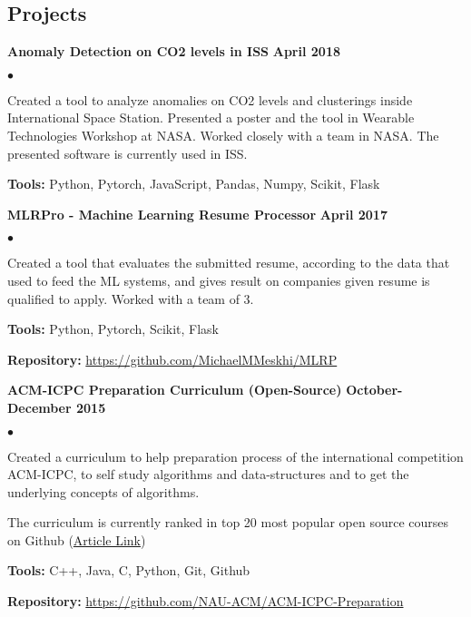 \documentclass[margin,line]{res}
\newenvironment{list2}{
  \begin{list}{$\bullet$}{%
      \setlength{\itemsep}{0in}
      \setlength{\parsep}{0in} \setlength{\parskip}{0in}
      \setlength{\topsep}{0in} \setlength{\partopsep}{0in} 
      \setlength{\leftmargin}{0.2in}}}{\end{list}}
\begin{document}
\begin{resume}
\section{\sc Projects}

{\bf Anomaly Detection on CO2 levels in ISS} \hfill {\bf April 2018}\\
\vspace{-.3cm}
\begin{list2}
\item Created a tool to analyze anomalies on CO2 levels and clusterings inside International Space Station. Presented a poster and the tool in Wearable Technologies Workshop at NASA. Worked closely with a team in NASA. The presented software is currently used in ISS.
\item \textbf{Tools:} Python, Pytorch, JavaScript, Pandas, Numpy, Scikit, Flask
\end{list2}


{\bf MLRPro - Machine Learning Resume Processor} \hfill {\bf April 2017}\\
\vspace{-.3cm}
\begin{list2}
\item Created a tool that evaluates the submitted resume, according to the data that used to feed the ML systems, and gives result on companies given resume is qualified to apply. Worked with a team of 3.
\item \textbf{Tools:} Python, Pytorch, Scikit, Flask
\item \textbf{Repository:} \href{https://github.com/MichaelMMeskhi/MLRP}{https://github.com/MichaelMMeskhi/MLRP}
\end{list2}

{\bf ACM-ICPC Preparation Curriculum (Open-Source)} \hfill {\bf October-December 2015}\\
\vspace{-.3cm}
\begin{list2}
\item Created a curriculum to help preparation process of the international competition ACM-ICPC, to self study algorithms and data-structures and to get the underlying concepts of algorithms.
\item The curriculum is currently ranked in top 20 most popular open source courses on Github (\href{https://education.github.community/t/20-of-the-most-popular-courses-on-github/27832}{Article Link})
\item \textbf{Tools:} C++, Java, C, Python, Git, Github
\item \textbf{Repository:} \href{https://github.com/NAU-ACM/ACM-ICPC-Preparation}{https://github.com/NAU-ACM/ACM-ICPC-Preparation}
\end{list2}


\end{resume}
\end{document}
